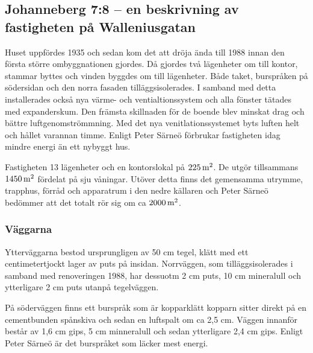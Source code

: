 \subsection{Johanneberg 7:8 – en beskrivning av fastigheten på Walleniusgatan}




Huset uppfördes 1935\cite{ritningar_urspr} och sedan kom det att dröja ända till 1988 innan den första större ombyggnationen gjordes. Då gjordes två lägenheter om till kontor, stammar byttes och vinden byggdes om till lägenheter. Både taket, burspråken på södersidan och den norra fasaden tilläggsisolerades. I samband med detta installerades också nya värme- och ventialtionssystem och alla fönster tätades med expanderskum. Den främsta skillnaden för de boende blev minskat drag och bättre luftgenomströmmning.  Med det nya venitlationssystemet byts luften helt och hållet varannan timme. Enligt Peter Särneö\cite{petersarneo} förbrukar fastigheten idag mindre energi än ett nybyggt hus.

Fastigheten 13 lägenheter och en kontorslokal på $\unit[225]{m^2}$. De utgör tillsammans $\unit[1450]{m^2}$ fördelat på sju våningar. Utöver detta finns det gemensamma utrymme, trapphus, förråd och apparatrum i den nedre källaren och Peter Särneö\cite{petersarneo} bedömmer att det totalt rör sig om ca $\unit[2000]{m^2}$.


\subsubsection{Väggarna}
Ytterväggarna bestod ursprungligen av 50 cm tegel, klätt med ett centimetertjockt lager av puts på insidan. Norrväggen, som tilläggsisolerades i samband med renoveringen 1988, har dessuotm 2 cm puts, 10 cm mineralull och ytterligare 2 cm puts utanpå tegelväggen.\cite{kandidatarbete2010}\cite{petersarneo} 

På söderväggen finns ett burspråk som är kopparklätt kopparn sitter direkt på en cementbunden spånskiva och sedan en luftspalt om ca 2,5 cm. Väggen innanför består av 1,6 cm gips, 5 cm minneralull och sedan ytterligare 2,4 cm gips.\cite{kandidatarbete2010} Enligt Peter Särneö\cite{petersarneo} är det burspråket som läcker mest energi.

